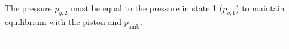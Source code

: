 The pressure \( p_{g,2} \) must be equal to the pressure in state 1 (\( p_{g,1} \)) to maintain equilibrium with the piston and \( p_{\text{amb}} \).  

---